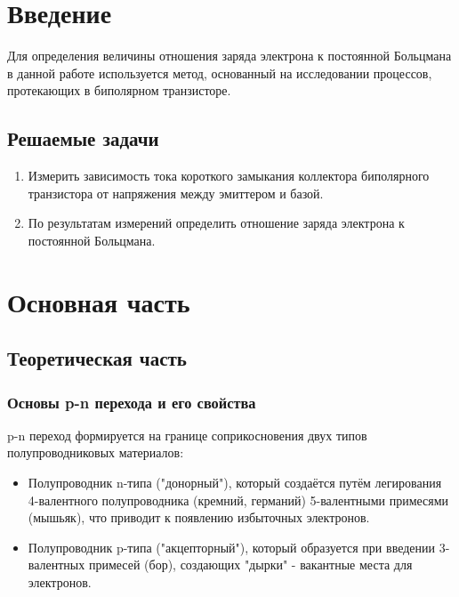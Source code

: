 \section{Введение}

Для определения величины отношения заряда электрона к постоянной Больцмана в данной работе используется метод, основанный на исследовании процессов, протекающих в биполярном транзисторе.

\subsection{Решаемые задачи}

\begin{enumerate}
    \item Измерить зависимость тока короткого замыкания коллектора биполярного транзистора от напряжения между эмиттером и базой.
    \item По результатам измерений определить отношение заряда электрона к постоянной Больцмана.
\end{enumerate}

\section{Основная часть}

\subsection{Теоретическая часть}

\subsubsection{Основы p-n перехода и его свойства}

p-n переход формируется на границе соприкосновения двух типов полупроводниковых материалов:
\begin{itemize}
\item Полупроводник n-типа ("донорный"), который создаётся путём легирования 4-валентного полупроводника (кремний, германий) 5-валентными примесями (мышьяк), что приводит к появлению избыточных электронов.
\item Полупроводник p-типа ("акцепторный"), который образуется при введении 3-валентных примесей (бор), создающих "дырки" - вакантные места для электронов.
\end{itemize}

